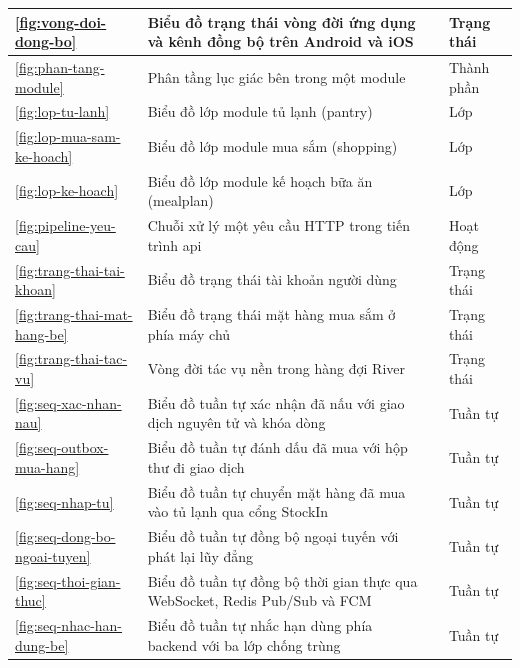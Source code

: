 {\begin{longtable}{|C{1.3cm}|L{\dimexpr{}\arrayrulewidth-1.3cm-5.6cm-2.4cm\relax}|L{5.6cm}|L{2.4cm}|}
\ref{fig:vong-doi-dong-bo} & Biểu đồ trạng thái vòng đời ứng dụng và kênh đồng bộ trên Android và iOS &  & Trạng thái\\ \hline
\ref{fig:phan-tang-module} & Phân tầng lục giác bên trong một module &  & Thành phần\\ \hline
\ref{fig:lop-tu-lanh} & Biểu đồ lớp module tủ lạnh (pantry) &  & Lớp\\ \hline
\ref{fig:lop-mua-sam-ke-hoach} & Biểu đồ lớp module mua sắm (shopping) &  & Lớp\\ \hline
\ref{fig:lop-ke-hoach} & Biểu đồ lớp module kế hoạch bữa ăn (mealplan) &  & Lớp\\ \hline
\ref{fig:pipeline-yeu-cau} & Chuỗi xử lý một yêu cầu HTTP trong tiến trình api &  & Hoạt động\\ \hline
\ref{fig:trang-thai-tai-khoan} & Biểu đồ trạng thái tài khoản người dùng &  & Trạng thái\\ \hline
\ref{fig:trang-thai-mat-hang-be} & Biểu đồ trạng thái mặt hàng mua sắm ở phía máy chủ &  & Trạng thái\\ \hline
\ref{fig:trang-thai-tac-vu} & Vòng đời tác vụ nền trong hàng đợi River &  & Trạng thái\\ \hline
\ref{fig:seq-xac-nhan-nau} & Biểu đồ tuần tự xác nhận đã nấu với giao dịch nguyên tử và khóa dòng &  & Tuần tự\\ \hline
\ref{fig:seq-outbox-mua-hang} & Biểu đồ tuần tự đánh dấu đã mua với hộp thư đi giao dịch &  & Tuần tự\\ \hline
\ref{fig:seq-nhap-tu} & Biểu đồ tuần tự chuyển mặt hàng đã mua vào tủ lạnh qua cổng StockIn &  & Tuần tự\\ \hline
\ref{fig:seq-dong-bo-ngoai-tuyen} & Biểu đồ tuần tự đồng bộ ngoại tuyến với phát lại lũy đẳng &  & Tuần tự\\ \hline
\ref{fig:seq-thoi-gian-thuc} & Biểu đồ tuần tự đồng bộ thời gian thực qua WebSocket, Redis Pub/Sub và FCM &  & Tuần tự\\ \hline
\ref{fig:seq-nhac-han-dung-be} & Biểu đồ tuần tự nhắc hạn dùng phía backend với ba lớp chống trùng &  & Tuần tự\\ \hline

\end{longtable}}
